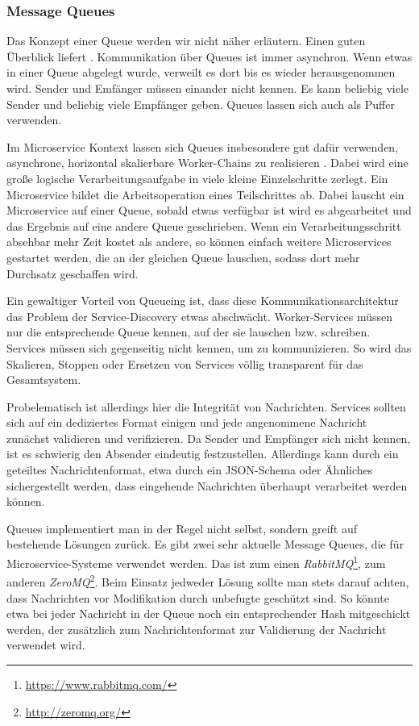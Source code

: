 \subsubsection{Message Queues}

Das Konzept einer Queue werden wir nicht näher erläutern. Einen guten Überblick liefert \cite{hohpe2003}. Kommunikation über Queues ist immer asynchron. Wenn etwas in einer Queue abgelegt wurde, verweilt es dort bis es wieder herausgenommen wird. Sender und Emfänger müssen einander nicht kennen. Es kann beliebig viele Sender und beliebig viele Empfänger geben. Queues lassen sich auch als Puffer verwenden. 

Im Microservice Kontext lassen sich Queues insbesondere gut dafür verwenden, asynchrone, horizontal skalierbare Worker-Chains zu realisieren \cite{newman2015}. Dabei wird eine große logische Verarbeitungsaufgabe in viele kleine Einzelschritte zerlegt. Ein Microservice bildet die Arbeitsoperation eines Teilschrittes ab. Dabei lauscht ein Microservice auf einer Queue, sobald etwas verfügbar ist wird es abgearbeitet und das Ergebnis auf eine andere Queue geschrieben. Wenn ein Verarbeitungsschritt absehbar mehr Zeit kostet als andere, so können einfach weitere Microservices gestartet werden, die an der gleichen Queue lauschen, sodass dort mehr Durchsatz geschaffen wird. 

Ein gewaltiger Vorteil von Queueing ist, dass diese Kommunikationsarchitektur das Problem der Service-Discovery etwas abschwächt. Worker-Services müssen nur die entsprechende Queue kennen, auf der sie lauschen bzw. schreiben. Services müssen sich gegenseitig nicht kennen, um zu kommunizieren. So wird das Skalieren, Stoppen oder Ersetzen von Services völlig transparent für das Gesamtsystem.

Probelematisch ist allerdings hier die Integrität von Nachrichten. Services sollten sich auf ein dediziertes Format einigen und jede angenommene Nachricht zunächst validieren und verifizieren. Da Sender und Empfänger sich nicht kennen, ist es schwierig den Absender eindeutig festzustellen. Allerdings kann durch ein geteiltes Nachrichtenformat, etwa durch ein JSON-Schema oder Ähnliches sichergestellt werden, dass eingehende Nachrichten überhaupt verarbeitet werden können.

Queues implementiert man in der Regel nicht selbst, sondern greift auf bestehende Lösungen zurück. Es gibt zwei sehr aktuelle Message Queues, die für Microservice-Systeme verwendet werden. Das ist zum einen \textit{RabbitMQ}\footnote{\url{https://www.rabbitmq.com/}}, zum anderen \textit{ZeroMQ}\footnote{\url{http://zeromq.org/}}. Beim Einsatz jedweder Lösung sollte man stets darauf achten, dass Nachrichten vor Modifikation durch unbefugte geschützt sind. So könnte etwa bei jeder Nachricht in der Queue noch ein entsprechender Hash mitgeschickt werden, der zusätzlich zum Nachrichtenformat zur Validierung der Nachricht verwendet wird. 

